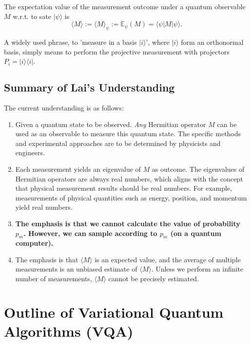 \documentclass[
        11pt, %
	a4paper, %
]{LegrandOrangeBook}
\begin{document}
\begin{definition}
    The expectation value of the measurement outcome under a quantum observable $M$ w.r.t. to sate $|\psi\rangle$ is
\begin{equation}
    \langle M \rangle:=\langle M \rangle_{\psi}:= \mathbb{E}_\psi(M)=\langle\psi|M| \psi\rangle.
\end{equation}
\end{definition}

\begin{remark}
    A widely used phrase, to 'measure in a basis $|i\rangle$', where $|i\rangle$ form an orthonormal basis, simply means to perform the projective measurement with projectors $P_i=|i\rangle\langle i|$.
\end{remark}

\subsection{Summary of Lai's Understanding}

The current understanding is as follows: %
\begin{enumerate}
    \item Given a quantum state to be observed. \textit{Any} Hermitian operator $M$ can be used as an observable to measure this quantum state. The specific methods and experimental approaches are to be determined by physicists and engineers.
    \item Each measurement yields an eigenvalue of $M$ as outcome. The eigenvalues of Hermitian operators are always real numbers, which aligns with the concept that physical measurement results should be real numbers. For example, measurements of physical quantities such as energy, position, and momentum yield real numbers.
    \item \textbf{The emphasis is that we cannot calculate the value of probability $p_m$. However, we can sample according to $p_m$ (on a quantum computer).} %
    \item The emphasis is that $\langle M \rangle$ is an expected value, and the average of multiple measurements is an unbiased estimate of $\langle M \rangle$. Unless we perform an infinite number of measurements, $\langle M \rangle$ cannot be precisely estimated.
\end{enumerate}

\section{Outline of Variational Quantum Algorithms (VQA) \cite{ding2023random,cerezo2021variational}}
\end{document}
